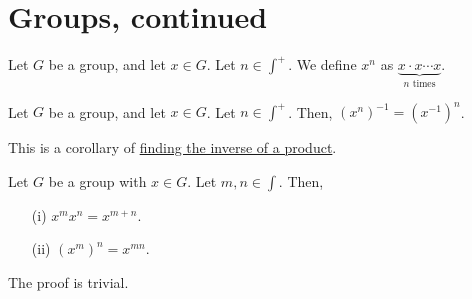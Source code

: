 
\section{Groups, continued}
    \renewcommand{\leftmark}{January 31, 2024}

    \begin{dfn}
        Let \(G\) be a group, and let \(x\in G\). Let \(n \in \int^+\). We define \(x^n\) as \(\underbrace{x\cdot x \cdots x}_{n\text{ times}}\).
    \end{dfn}

    \begin{thm}
        Let \(G\) be a group, and let \(x\in G\). Let \(n \in \int^+\). Then, \((x^n)^{-1} = (x^{-1})^n\).
    \end{thm}

    This is a corollary of \hyperref[thm:general-product-inverse]{finding the inverse of a product}.

    \begin{thm}
        Let \(G\) be a group with \(x\in G\). Let \(m, n\in\int\). Then,
        \begin{enumerate}
            \item[(i)] \(x^m x^n = x^{m + n}\).
            \item[(ii)] \((x^m)^n = x^{mn}\).
        \end{enumerate}
    \end{thm}

    The proof is trivial.





